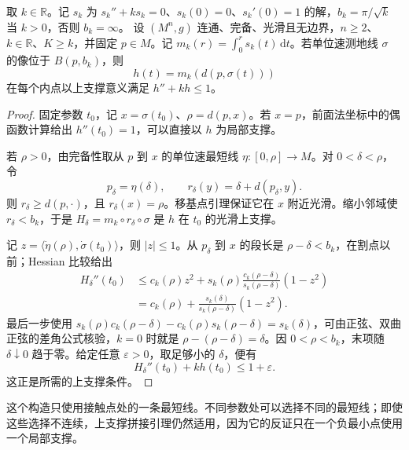 \begin{proposition}\label{g3:prop:global-modified-distance-hessian}
	取 \(k\in\mathbb R\)。记 \(s_k\) 为 \(s_k''+ks_k=0\)、\(s_k(0)=0\)、\(s_k'(0)=1\) 的解，\(b_k=\pi/\sqrt k\) 当 \(k>0\)，否则 \(b_k=\infty\)。
 设 \((M^n,g)\) 连通、完备、光滑且无边界，\(n\ge2\)、\(k\in\mathbb R\)、\(K\ge k\)，并固定 \(p\in M\)。记 \(m_k(r)=\int_0^r s_k(t)\,\mathrm dt\)。若单位速测地线 \(\sigma\) 的像位于 \(B(p,b_k)\)，则
 \[
 h(t)=m_k(d(p,\sigma(t)))
 \]
 在每个内点以上支撑意义满足 \(h''+kh\le1\)。
\end{proposition}
\begin{proof}
 固定参数 \(t_0\)，记 \(x=\sigma(t_0)\)、\(\rho=d(p,x)\)。若 \(x=p\)，前面法坐标中的偶函数计算给出 \(h''(t_0)=1\)，可以直接以 \(h\) 为局部支撑。

 若 \(\rho>0\)，由完备性取从 \(p\) 到 \(x\) 的单位速最短线 \(\eta:[0,\rho]\to M\)。对 \(0<\delta<\rho\)，令
 \[
 p_\delta=\eta(\delta),\qquad r_\delta(y)=\delta+d(p_\delta,y).
 \]
 则 \(r_\delta\ge d(p,\cdot)\)，且 \(r_\delta(x)=\rho\)。移基点引理保证它在 \(x\) 附近光滑。缩小邻域使 \(r_\delta<b_k\)，于是 \(H_\delta=m_k\circ r_\delta\circ\sigma\) 是 \(h\) 在 \(t_0\) 的光滑上支撑。

 记 \(z=\langle\dot\eta(\rho),\dot\sigma(t_0)\rangle\)，则 \(|z|\le1\)。从 \(p_\delta\) 到 \(x\) 的段长是 \(\rho-\delta<b_k\)，在割点以前；Hessian 比较给出
 \[
 \begin{split}
 H_\delta''(t_0)
 &\le c_k(\rho)z^2+s_k(\rho)
       \frac{c_k(\rho-\delta)}{s_k(\rho-\delta)}(1-z^2)\\
 &=c_k(\rho)+
   \frac{s_k(\delta)}{s_k(\rho-\delta)}(1-z^2).
 \end{split}
 \]
 最后一步使用 \(s_k(\rho)c_k(\rho-\delta)-c_k(\rho)s_k(\rho-\delta)=s_k(\delta)\)，可由正弦、双曲正弦的差角公式核验，\(k=0\) 时就是 \(\rho-(\rho-\delta)=\delta\)。因 \(0<\rho<b_k\)，末项随 \(\delta\downarrow0\) 趋于零。给定任意 \(\varepsilon>0\)，取足够小的 \(\delta\)，便有
 \[
 H_\delta''(t_0)+kh(t_0)\le1+\varepsilon.
 \]
 这正是所需的上支撑条件。
\end{proof}

这个构造只使用接触点处的一条最短线。不同参数处可以选择不同的最短线；即使这些选择不连续，上支撑拼接引理仍然适用，因为它的反证只在一个负最小点使用一个局部支撑。

